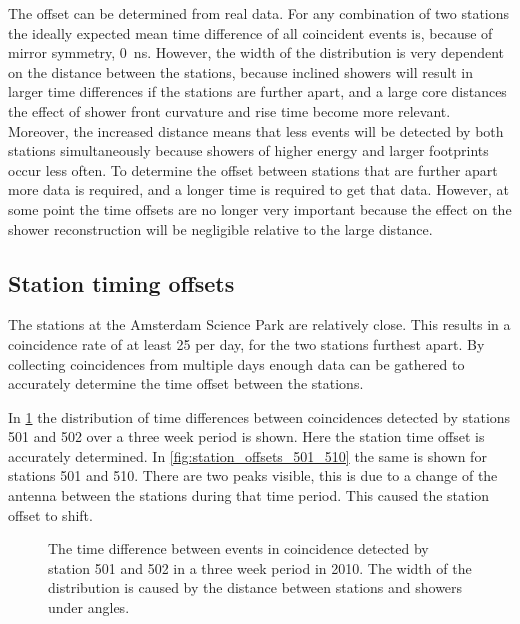 The offset can be determined from real data. For any combination of two stations the ideally expected mean time difference of all coincident events is, because of mirror symmetry, \SI{0}{\ns}. However, the width of the distribution is very dependent on the distance between the stations, because inclined showers will result in larger time differences if the stations are further apart, and a large core distances the effect of shower front curvature and rise time become more relevant. Moreover, the increased distance means that less events will be detected by both stations simultaneously because showers of higher energy and larger footprints occur less often. To determine the offset between stations that are further apart more data is required, and a longer time is required to get that data. However, at some point the time offsets are no longer very important because the effect on the shower reconstruction will be negligible relative to the large distance.


\subsection{Station timing offsets}

The \hisparc stations at the Amsterdam Science Park are relatively close. This results in a coincidence rate of at least 25 per day, for the two stations furthest apart. By collecting coincidences from multiple days enough data can be gathered to accurately determine the time offset between the stations.

In \cref{fig:station_offsets_501_502} the distribution of time differences between coincidences detected by stations 501 and 502 over a three week period is shown. Here the station time offset is accurately determined. In \cref{fig:station_offsets_501_510} the same is shown for stations 501 and 510. There are two peaks visible, this is due to a change of the \gps antenna between the stations during that time period. This caused the station offset to shift.

\begin{figure}
    \centering
    
    \caption{ The
             time difference between events in coincidence detected by
             station 501 and 502 in a three week period in 2010. The
             width of the distribution is caused by the distance between
             stations and showers under angles.}
    \label{fig:station_offsets_501_502}
\end{figure}

